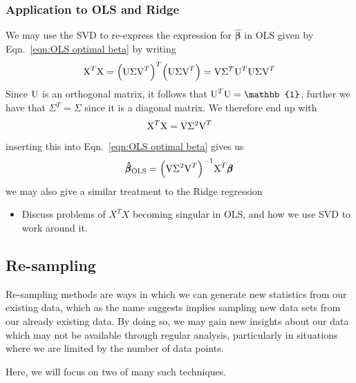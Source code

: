 \documentclass[reprint, english, nofootinbib]{revtex4-2}
\begin{document}
        \subsubsection{Application to OLS and Ridge}
            We may use the SVD to re-express the expression for $\hat{\pmb \beta}$ in OLS given by Eqn.~\ref{eqn:OLS optimal beta}
            by writing
            \begin{equation}
                \textup{X}^T\textup{X} = \qty(\textup{U}\Sigma\textup{V}^T)^T\qty(\textup{U}\Sigma\textup{V}^T)
                = \textup{V}\Sigma^T\textup{U}^T\textup{U}\Sigma\textup{V}^T
            \end{equation}
            Since $\textup{U}$ is an orthogonal matrix, it follows that $\textup{U}^T\textup{U} = \mathbb{1}$, further we have that $\Sigma^T = \Sigma$ since it is a diagonal matrix. We therefore end up with
            \begin{equation}
                \textup{X}^T\textup{X} = \textup{V}\Sigma^2\textup{V}^T
            \end{equation}
            inserting this into Eqn.~\ref{eqn:OLS optimal beta} gives us
            \begin{equation}
                \pmb{\hat{\beta}}_{\textup{OLS}} = \qty(\textup{V}\Sigma^2\textup{V}^T)^{-1} \textup{X}^T\pmb{\beta}
            \end{equation}
            we may also give a similar treatment to the Ridge regression



        \begin{itemize}
            \item Discuss problems of $X^T X$ becoming singular in OLS, and how we use SVD to work around it.
        \end{itemize}

    \subsection{Re-sampling}
        \noindent
        Re-sampling methods are ways in which we can generate new statistics from our existing data, which as the name suggests implies sampling new data sets from our already existing data. By doing so, we may gain new insights about our data which may not be available through regular analysis, particularly in situations where we are limited by the number of data points.

        Here, we will focus on two of many such techniques.
\end{document}
